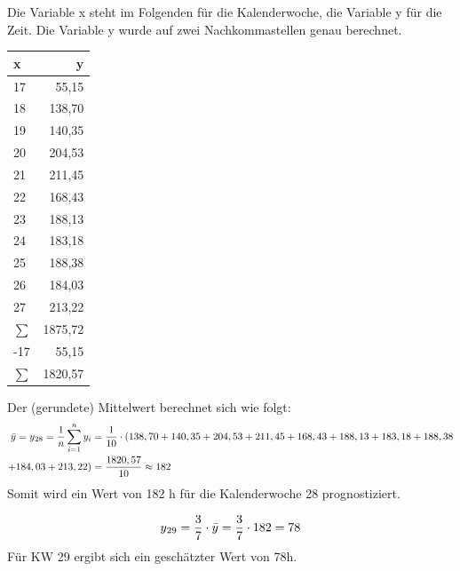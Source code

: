 \documentclass[../review_3.tex]{subfiles}
\begin{document}
Die Variable x steht im Folgenden für die Kalenderwoche, die Variable y für die Zeit. Die Variable y wurde auf zwei Nachkommastellen genau berechnet.
\begin{longtable} [h] {l r} \toprule
    \textbf{x} & \textbf{y} \\ \midrule \endhead
    17         & 55,15      \\
    18         & 138,70     \\
    19         & 140,35     \\
    20         & 204,53     \\
    21         & 211,45     \\
    22         & 168,43     \\
    23         & 188,13     \\
    24         & 183,18     \\
    25         & 188,38     \\
    26         & 184,03     \\
    27         & 213,22     \\\midrule
    $\sum$     & 1875,72    \\
    -17        & 55,15      \\ \midrule
    $\sum$     & 1820,57    \\ \bottomrule
\end{longtable}

Der (gerundete) Mittelwert berechnet sich wie folgt:
\begin{align*}
    \bar{y} = y \textsubscript{28}=  \frac{1}{n}\sum_{i=1}^{n}y_i
     & = \frac{1}{10} \cdot (138,70+140,35+204,53+211,45+168,43+188,13 +183,18 +188,38 \\+184,03+213,22)
     & = \frac{1820,57}{10} \approx 182\end{align*}
Somit wird ein Wert von 182 h für die Kalenderwoche 28 prognostiziert.

\begin{align*}
    y \textsubscript{29} = \frac{3}{7} \cdot \bar{y} = \frac{3}{7}  \cdot 182 = 78
\end{align*}
Für KW 29 ergibt sich ein geschätzter Wert von 78h.
\end{document}
